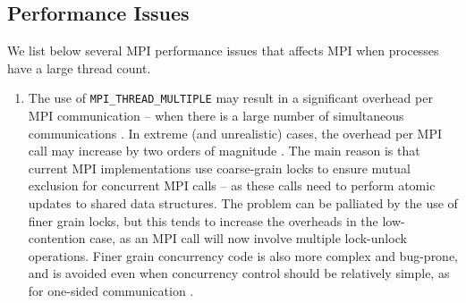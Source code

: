 	\subsection{Performance Issues}
	We list below several MPI performance issues that affects MPI when 
	processes have a large thread count.
	\begin{enumerate}
		\item 
			The use of \texttt{MPI\_THREAD\_MULTIPLE} may result in a 
			significant overhead per MPI communication -- when there is a large 
			number of simultaneous communications \cite{thakur2009test, 
			goodell2010minimizing,farmer2016mpi}. In 
			extreme (and 
			unrealistic) cases, the overhead per MPI call may increase by two 
			orders of magnitude \cite{dang2017eliminating}. The main reason is 
			that current MPI 
			implementations use coarse-grain locks to ensure mutual exclusion 
			for concurrent MPI calls -- as these calls need to perform atomic 
			updates to shared data structures. The problem can be palliated by 
			the use of finer grain locks, but this tends to increase the 
			overheads in the low-contention case, as an MPI call will now 
			involve multiple lock-unlock operations. Finer grain concurrency 
			code is also more complex and bug-prone, and is avoided even when 
			concurrency control should be relatively simple, as for one-sided 
			communication
			\cite{dosanjh2016rma}.
			

\end{enumerate}
